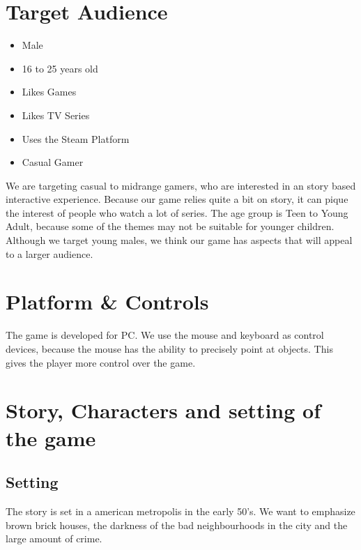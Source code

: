 \documentclass{article}
\begin{document}
\section{Target Audience}
	\begin{itemize}
		\item Male
		\item 16 to 25 years old
		\item Likes Games
		\item Likes TV Series
		\item Uses the Steam Platform
		\item Casual Gamer
	\end{itemize}
	We are targeting casual to midrange gamers, who are interested in an story based interactive experience. Because our game relies quite a bit on story, it can pique the interest of people who watch a lot of series. The age group is Teen to Young Adult, because some of the themes may not be suitable for younger children. Although we target young males, we think our game has aspects that will appeal to a larger audience.


\section{Platform \& Controls}
	The game is developed for PC. We use the mouse and keyboard as control devices, because the mouse has the ability to precisely point at objects. This gives the player more control over the game.

\section{Story, Characters and setting of the game}
	\subsection{Setting}
		The story is set in a american metropolis in the early 50's. We want to emphasize brown brick houses, the darkness of the bad neighbourhoods in the city and the large amount of crime.
\end{document}
